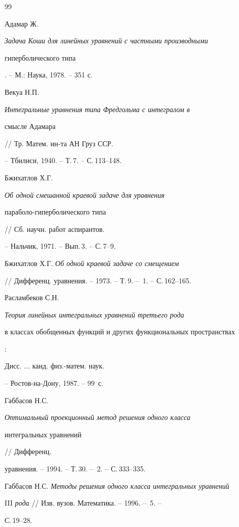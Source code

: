 \begin{thebibliography}{99} 


 




Адамар Ж. {\em Задача Коши для линейных уравнений с частными производными 


гиперболического типа}. -- М.: Наука, 1978. -- 351 с. 




Векуа Н.П. {\em Интегральные уравнения типа Фредгольма с интегралом в 


смысле Адамара} // Тр. Матем. ин-та АН Груз ССР. 


-- Тбилиси, 1940. -- Т.\,7. -- С.\,113--148. 




Бжихатлов Х.Г. {\em Об одной смешанной краевой задаче для уравнения 


параболо-гиперболического типа} // Сб. научн. работ аспирантов. 


-- Нальчик, 1971. -- Вып.\,3. -- С.\,7--9. 




Бжихатлов Х.Г. {\em Об одной краевой задаче со смещением} 


// Дифференц. уравнения. -- 1973. -- Т.\,9. -- \No\,1. -- С.\,162--165. 




Расламбеков С.Н. {\em Теория линейных интегральных уравнений третьего рода 


в классах обобщенных функций и других функциональных пространствах}: 


Дисс. $\dotsc$ канд. физ.-матем. наук. 


-- Ростов-на-Дону, 1987. -- 99~с. 




Габбасов Н.С. {\em Оптимальный проекционный метод решения одного класса 


интегральных уравнений} // Дифференц. 


уравнения. -- 1994. -- Т.\,30. -- \No\,2. -- С.\,333--335. 




Габбасов Н.С. {\em Методы решения одного класса интегральных уравнений} 


III {\em рода} // Изв. вузов. Математика. -- 1996. -- \No\,5. -- 


С.\,19--28. 





\end{thebibliography}

